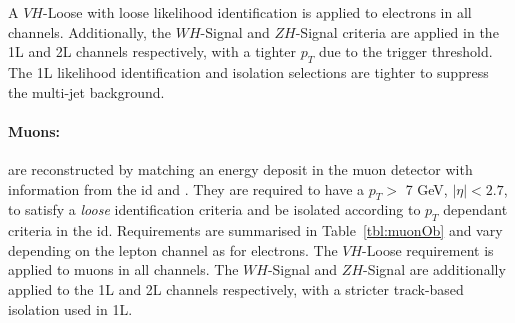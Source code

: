 \begin{table}[!htbp]
  \begin{center}
    \caption{Electron Selection requirements.} %
    \label{tbl:elOb}
  \end{center}
\end{table}

A $VH$-Loose with loose likelihood identification is applied to electrons in all channels. Additionally, the $WH$-Signal and $ZH$-Signal criteria are applied in the 1L and 2L channels respectively, with a tighter $p_T$ due to the trigger threshold. The 1L likelihood identification and isolation selections are tighter to suppress the multi-jet background.

\paragraph{Muons:} are reconstructed by matching an energy deposit in the muon detector with information from the \gls{id} and  \cite{Aad:2746302}. They are required to have a $p_T >$ 7 GeV, $|\eta| < 2.7$, to satisfy a \textit{loose} identification criteria and be isolated according to $p_T$ dependant criteria in the \gls{id}. Requirements are summarised in Table~\ref{tbl:muonOb} and vary depending on the lepton channel as for electrons. The $VH$-Loose requirement is applied to muons in all channels. The $WH$-Signal and $ZH$-Signal are additionally applied to the 1L and 2L channels respectively, with a stricter track-based isolation used in 1L.

